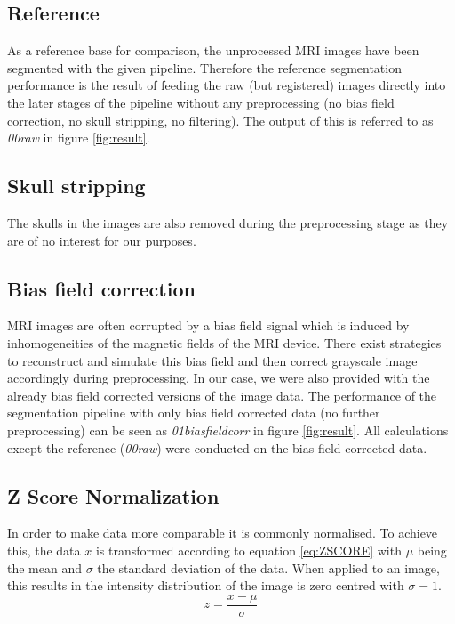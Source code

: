\documentclass[journal]{IEEEtran}
\begin{document}
\subsection{Reference}
As a reference base for comparison, the unprocessed MRI images have been segmented with the given pipeline. Therefore the reference segmentation performance is the result of feeding the raw (but registered) images directly into the later stages of the pipeline without any preprocessing (no bias field correction, no skull stripping, no filtering). The output of this is referred to as \textit{00raw} in figure \ref{fig:result}.

\subsection{Skull stripping}
The skulls in the images are also removed during the preprocessing stage as they are of no interest for our purposes.

\subsection{Bias field correction}
MRI images are often corrupted by a bias field signal which is induced by inhomogeneities of the magnetic fields of the MRI device. There exist strategies to reconstruct and simulate this bias field and then correct grayscale image accordingly during preprocessing. In our case, we were also provided with the already bias field corrected versions of the image data. The performance of the segmentation pipeline with only bias field corrected data (no further preprocessing) can be seen as \textit{01biasfieldcorr} in figure \ref{fig:result}. All calculations except the reference (\textit{00raw}) were conducted on the bias field corrected data.

\subsection{Z Score Normalization}
In order to make data more comparable it is commonly normalised. To achieve this, the data $x$ is transformed according to equation \ref{eq:ZSCORE} with $\mu$ being the mean and $\sigma$ the standard deviation of the data. When applied to an image, this results in the intensity distribution of the image is zero centred with $\sigma = 1$.
\begin{equation}
    \label{eq:ZSCORE}
    z = \frac{x - \mu}{\sigma}{}
\end{equation}
\end{document}
